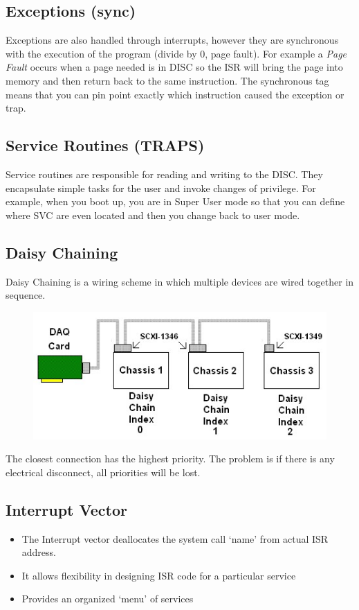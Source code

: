 \documentclass{hw}
\begin{document}
\subsection{Exceptions (sync)}
Exceptions are also handled through interrupts, however they are synchronous with
the execution of the program (divide by 0, page fault). For example a 
\emph{Page Fault} occurs when a page needed is in DISC so the ISR will bring the 
page into memory and then return back to the same instruction. The synchronous 
tag means that you can pin point exactly which instruction caused the exception
or trap.

\subsection{Service Routines (TRAPS)}
Service routines are responsible for reading and writing to the DISC\@. They 
encapsulate simple tasks for the user and invoke changes of privilege. For example,
when you boot up, you are in Super User mode so that you can define where SVC are
even located and then you change back to user mode.

\subsection{Daisy Chaining}
Daisy Chaining is a wiring scheme in which multiple devices are wired together 
in sequence. 
\begin{figure}[H]
  \centering
  \includegraphics[scale=.8]{dchain}
\end{figure}

The closest connection has the highest priority. The problem is if there is any
electrical disconnect, all priorities will be lost.

\subsection{Interrupt Vector}
\begin{itemize}
  \item The Interrupt vector deallocates the system call `name' from actual ISR
    address.
  \item It allows flexibility in designing ISR code for a particular service
  \item Provides an organized `menu' of services
\end{itemize}
\end{document}
